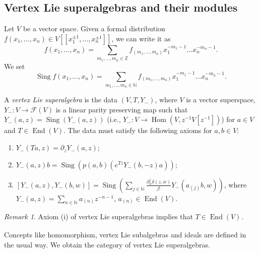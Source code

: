 \documentclass[a4paper, 12pt, reqno]{amsart}
\theoremstyle{remark}
\newtheorem{remark}[theorem]{Remark}
\numberwithin{equation}{subsection}
\DeclareMathOperator{\End}{End}
\DeclareMathOperator{\zero}{\overline{0}}
\DeclareMathOperator{\Hom}{Hom}
\DeclareMathOperator{\Sing}{Sing}
\begin{document}
\subsection{Vertex Lie superalgebras and their modules}
\label{sec:vert-lie-supera}

Let $V$ be a vector space.
Given a formal distribution $f(x_1, \dots, x_n) \in V[[x_1^{\pm 1}, \dots, x_n^{\pm 1}]]$, we can write it as
\begin{equation*}
  f(x_1, \dots, x_n) = \sum_{m_1, \dots, m_n \in \mathbb{Z}}f_{(m_1, \dots, m_n)}x_1^{-m_1 - 1}\dots x_n^{-m_n - 1}.
\end{equation*}
We set
\begin{equation*}
  \Sing f(x_1, \dots, x_n) = \sum_{m_1, \dots, m_n \in \mathbb{N}}f_{(m_1, \dots, m_n)}x_1^{-m_1 - 1}\dots x_n^{-m_n - 1}.
\end{equation*}

A \emph{vertex Lie superalgebra} is the data $(V, T, Y_-)$, where $V$ is a vector superspace, $Y_-: V \to \mathcal{F}(V)$ is a linear parity preserving map such that $Y_-(a, z) = \Sing(Y_-(a, z))$ (i.e., $Y_-: V \to \Hom(V, z^{-1}V[z^{-1}])$) for $a \in V$ and $T \in \End(V)$.
The data must satisfy the following axioms for $a, b \in V$:
\begin{enumerate}
\item $Y_-(Ta, z) = \partial_zY_-(a, z)$;
\item $Y_-(a, z)b = \Sing(p(a, b)(e^{Tz}Y_-(b, -z)a))$;
\item $[Y_-(a, z), Y_-(b, w)] = \Sing(\sum_{j \in \mathbb{N}}\frac{\partial^j_w\delta(z, w)}{j!}Y_-(a_{(j)}b, w))$, where $Y_-(a, z) = \sum_{n \in \mathbb{N}}a_{(n)}z^{-n - 1}$, $a_{(n)} \in \End(V)$.
\end{enumerate}

\begin{remark}
  \label{rmk:36}
  Axiom (i) of vertex Lie superalgebras implies that $T \in \End(V)_{\zero}$.
\end{remark}

Concepts like homomorphism, vertex Lie subalgebras and ideals are defined in the usual way.
We obtain the category of vertex Lie superalgebras.
\end{document}
